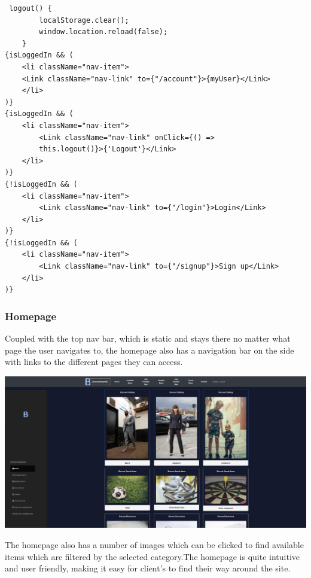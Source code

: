 \begin{verbatim}
 logout() {
        localStorage.clear();
        window.location.reload(false);
    }
{isLoggedIn && (
    <li className="nav-item">
    <Link className="nav-link" to={"/account"}>{myUser}</Link>
    </li>
)}
{isLoggedIn && (
    <li className="nav-item">
        <Link className="nav-link" onClick={() => 
        this.logout()}>{'Logout'}</Link>
    </li>
)}
{!isLoggedIn && (
    <li className="nav-item">
        <Link className="nav-link" to={"/login"}>Login</Link>
    </li>
)}
{!isLoggedIn && (
    <li className="nav-item">
        <Link className="nav-link" to={"/signup"}>Sign up</Link>
    </li>
)}
\end{verbatim}
\subsubsection{Homepage}
Coupled with the top nav bar, which is static and stays there no matter what page the user navigates to, the homepage also has a navigation bar on the side with links to the different pages they can access.
\par
\includegraphics[scale=0.3]{img/fe_homepage.PNG}
\par
The homepage also has a number of images which can be clicked to find available items which are filtered by the selected category.The homepage is quite intuitive and user friendly, making it easy for client's to find their way around the site.  
